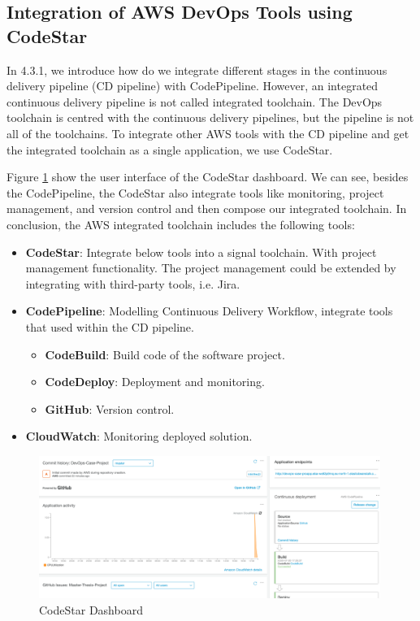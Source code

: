 \subsection{Integration of AWS DevOps Tools using CodeStar}
In 4.3.1, we introduce how do we integrate different stages in the continuous delivery pipeline (CD pipeline) with CodePipeline. However, an integrated continuous delivery pipeline is not called integrated toolchain. The DevOps toolchain is centred with the continuous delivery pipelines, but the pipeline is not all of the toolchains. To integrate other AWS tools with the CD pipeline and get the integrated toolchain as a single application, we use CodeStar.  
\par
Figure \ref{fig:codestar} show the user interface of the CodeStar dashboard. We can see, besides the CodePipeline, the CodeStar also integrate tools like monitoring, project management, and version control and then compose our integrated toolchain. In conclusion, the AWS integrated toolchain includes the following tools:\label{codestar}
\begin{itemize}
     \item \textbf{CodeStar}: Integrate below tools into a signal toolchain. With project management functionality. The project management could be extended by integrating with third-party tools, i.e. Jira.
          \item \textbf{CodePipeline}: Modelling Continuous Delivery Workflow, integrate tools that used within the CD pipeline.
          \begin{itemize}
               \item \textbf{CodeBuild}: Build code of the software project.
               \item \textbf{CodeDeploy}: Deployment and monitoring.
               \item \textbf{GitHub}: Version control.
          \end{itemize}
          \item \textbf{CloudWatch}: Monitoring deployed solution.
\end{itemize}
\begin{figure}[h]
     \centering
     \includegraphics[width=0.99\textwidth]{pics/codestar.png}
     \caption{CodeStar Dashboard}
     \label{fig:codestar}
    \end{figure}


